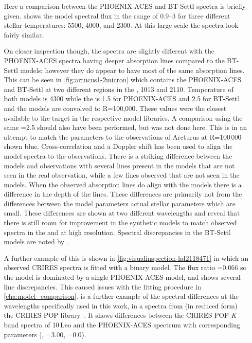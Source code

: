Here a comparison between the {PHOENIX-ACES} and {BT-Settl} spectra is briefly given.
 shows the model spectral flux in the \nir{} range of 0.9--3\um{} for three different stellar temperatures: 5500, 4000, and 2300\K{}.
At this large scale the spectra look fairly similar.

On closer inspection though, the spectra are slightly different with the {PHOENIX-ACES} spectra having deeper absorption lines compared to the {BT-Settl} models; however they do appear to have most of the same absorption lines.
This can be seen in \cref{fig:artucus1-2micron} which contains the {PHOENIX-ACES} and {BT-Settl} at two different regions in the \nir, 1013\nm{} and 2110\nm{}.
Temperature of both models is 4300\K{} while the \Logg{} is 1.5 for {PHOENIX-ACES} and 2.5 for {BT-Settl} and the models are convolved to R=100,000.
These \Logg{} values were the closest available to the target in the respective model libraries.
A comparison using the same \Logg{}=2.5 should also have been performed, but was not done here.
This is in an attempt to match the parameters to the observations of {Arcturus} at R=100\,000 shown blue.
Cross-correlation and a Doppler shift has been used to align the model spectra to the observations.
There is a striking difference between the models and observations with several lines present in the models that are not seen in the real observation, while a few lines observed that are not seen in the models.
When the observed absorption lines do align with the models there is a difference in the depth of the lines.
These differences are primarily not from the differences between the model parameters actual stellar parameters which are small.
These differences are shown at two different wavelengths and reveal that there is still room for improvement in the synthetic models to match observed spectra in the \nir{} and at high resolution.
Spectral discrepancies in the {BT-Settl} models are noted by~\citet{rajpurohit_effective_2013}.

A further example of this is shown in \cref{fig:visualinspection-hd2118471} in which an observed {CRIRES} spectra is fitted with a binary model.
The flux ratio \FtwoFone{}=0.066 so the model is dominated by a single {PHOENIX-ACES} model, and shows several line discrepancies.
This caused issues with the fitting procedure in \cref{cha:model_comparison}.
 is a further example of the spectral differences at the \nir{} wavelengths specifically used in this work, in a spectra from (in reduced form) the CRIRES-POP library~\citep{lebzelter_crirespop_2012,nicholls_crirespop_2017}.
It shows differences between the CRIRES-POP \emph{K}-band spectra of {10\,Leo} and the {PHOENIX-ACES} spectrum with corresponding parameters (, \Logg{}=3.00, \feh{}=0.0).


